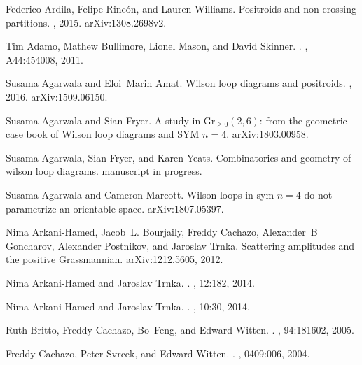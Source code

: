 \documentclass[11pt]{article}
\theoremstyle{remark}
\theoremstyle{definition}
\begin{document}
\begin{thebibliography}{50}

Federico Ardila, Felipe Rinc{\'{o}}n, and Lauren Williams.
\newblock Positroids and non-crossing partitions.
, 2015.
\newblock arXiv:1308.2698v2.


Tim Adamo, Mathew Bullimore, Lionel Mason, and David Skinner.
.
, A44:454008, 2011.

Susama Agarwala and Eloi~Marin Amat.
\newblock Wilson loop diagrams and positroids.
, 2016.
\newblock arXiv:1509.06150.

Susama Agarwala and Sian Fryer.
\newblock A study in $\textrm{Gr}_{\geq 0}(2,6)$: from the geometric case book
  of {W}ilson loop diagrams and {SYM} $n=4$.
\newblock arXiv:1803.00958.

Susama Agarwala, Sian Fryer, and Karen Yeats.
\newblock Combinatorics and geometry of wilson loop diagrams.
\newblock manuscript in progress.

Susama Agarwala and Cameron Marcott.
\newblock Wilson loops in sym $n=4$ do not parametrize an orientable space.
\newblock arXiv:1807.05397.

Nima Arkani-Hamed, Jacob~L. Bourjaily, Freddy Cachazo, Alexander~B Goncharov,
  Alexander Postnikov, and Jaroslav Trnka.
\newblock Scattering amplitudes and the positive {G}rassmannian.
\newblock arXiv:1212.5605, 2012.

Nima Arkani-Hamed and Jaroslav Trnka.
.
, 12:182, 2014.

Nima Arkani-Hamed and Jaroslav Trnka.
.
, 10:30, 2014.

Ruth Britto, Freddy Cachazo, Bo~Feng, and Edward Witten.
.
, 94:181602, 2005.

Freddy Cachazo, Peter Svrcek, and Edward Witten.
.
, 0409:006, 2004.


\end{thebibliography}
\end{document}
